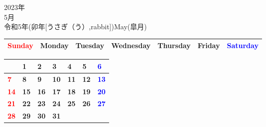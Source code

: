 \documentclass[a4paper,landscape]{jsarticle}
\newcommand{\dig}{\hspace{29mm}}
\newcommand{\tdig}{\hspace{27mm}}
\newcommand{\LBF}{\LARGE\textbf}
\begin{document}
\newpage

\begin{center}
	\HUGE 2023年\\
	\huge 5月\\
	\large 令和5年(卯年[うさぎ（う）,rabbit])May(皐月)
\end{center}

\begingroup
\renewcommand{\arraystretch}{1.4}
\begin{tabular}{|>{\centering\arraybackslash}p{32mm}|>{\centering\arraybackslash}p{32mm}|>{\centering\arraybackslash}p{32mm}|>{\centering\arraybackslash}p{32mm}|>{\centering\arraybackslash}p{32mm}|>{\centering\arraybackslash}p{32mm}|>{\centering\arraybackslash}p{32mm}|}
\hline
\textcolor{red}{\large Sunday}&\large Monday&\large Tuesday&\large Wednesday&\large Thursday&\large Friday&\textcolor{blue}{\large Saturday}\\
\hline
\end{tabular}
\endgroup

\begingroup
\renewcommand{\arraystretch}{4}
\begin{tabular}{|p{32mm}|p{32mm}|p{32mm}|p{32mm}|p{32mm}|p{32mm}|p{32mm}|}
\hline
&\raisebox{30pt} {\dig\LBF{1}}&\raisebox{30pt} {\dig\LBF{2}}&\raisebox{30pt} {\dig\LBF{3}}&\raisebox{30pt} {\dig\LBF{4}}&\raisebox{30pt} {\dig\LBF{5}}&\raisebox{30pt} {\dig\textcolor{blue}{\LBF{6}}}\\
\hline
\raisebox{30pt} {\dig\textcolor{red}{\LBF{7}}}&\raisebox{30pt} {\dig\LBF{8}}&\raisebox{30pt} {\dig\LBF{9}}&\raisebox{30pt} {\tdig\LBF{10}}&\raisebox{30pt} {\tdig\LBF{11}}&\raisebox{30pt} {\tdig\LBF{12}}&\raisebox{30pt} {\tdig\textcolor{blue}{\LBF{13}}}\\
\hline
\raisebox{30pt} {\tdig\textcolor{red}{\LBF{14}}}&\raisebox{30pt} {\tdig\LBF{15}}&\raisebox{30pt} {\tdig\LBF{16}}&\raisebox{30pt} {\tdig\LBF{17}}&\raisebox{30pt} {\tdig\LBF{18}}&\raisebox{30pt} {\tdig\LBF{19}}&\raisebox{30pt} {\tdig\textcolor{blue}{\LBF{20}}}\\
\hline
\raisebox{30pt} {\tdig\textcolor{red}{\LBF{21}}}&\raisebox{30pt} {\tdig\LBF{22}}&\raisebox{30pt} {\tdig\LBF{23}}&\raisebox{30pt} {\tdig\LBF{24}}&\raisebox{30pt} {\tdig\LBF{25}}&\raisebox{30pt} {\tdig\LBF{26}}&\raisebox{30pt} {\tdig\textcolor{blue}{\LBF{27}}}\\
\hline
\raisebox{30pt} {\tdig\textcolor{red}{\LBF{28}}}&\raisebox{30pt} {\tdig\LBF{29}}&\raisebox{30pt} {\tdig\LBF{30}}&\raisebox{30pt} {\tdig\LBF{31}}&&&\\
\hline
\end{tabular}
\endgroup
\end{document}
